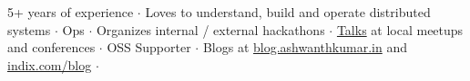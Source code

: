 

\begin{cvparagraph}
5+ years of experience ${\cdotp}$ Loves to understand, build and operate distributed systems ${\cdotp}$ Ops ${\cdotp}$ Organizes internal / external hackathons ${\cdotp}$ \href{https://speakerdeck.com/ashwanthkumar}{Talks} at local meetups and conferences ${\cdotp}$ OSS Supporter ${\cdotp}$ Blogs at \href{http://blog.ashwanthkumar.in/}{blog.ashwanthkumar.in} and \href{http://www.indix.com/blog/author/ashwanth/}{indix.com/blog} ${\cdotp}$ 
\end{cvparagraph}
